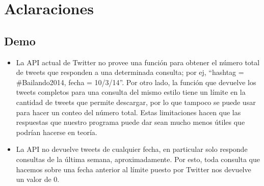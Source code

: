 \section{Aclaraciones} 


\subsection{Demo}

\begin{itemize}

 \item La API actual de Twitter no provee una función para obtener el número total de tweets que responden a una determinada consulta; por ej, ``hashtag = \#Bailando2014, fecha = 10/3/14''. Por otro lado, la función que devuelve los tweets completos para una consulta del mismo estilo tiene un límite en la cantidad de tweets que permite descargar, por lo que tampoco se puede usar para hacer un conteo del número total. Estas limitaciones hacen que las respuestas que nuestro programa puede dar sean mucho menos útiles que podrían hacerse en teoría.

 \item La API no devuelve tweets de cualquier fecha, en particular solo responde consultas de la última semana, aproximadamente. Por esto, toda consulta que hacemos sobre una fecha anterior al límite puesto por Twitter nos devuelve un valor de 0.

\end{itemize}